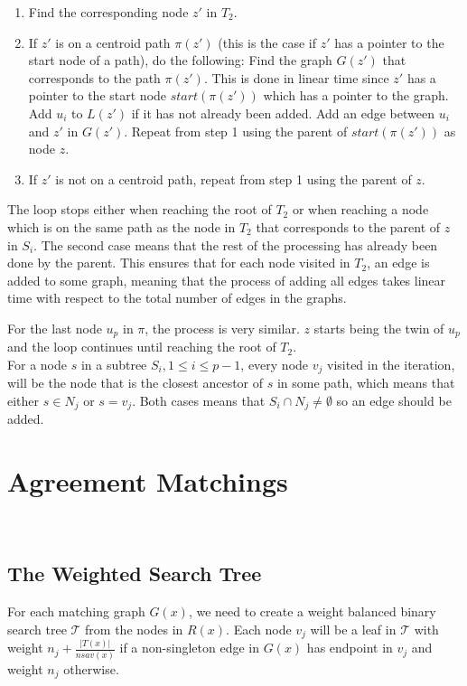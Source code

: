 \begin{enumerate}
	\item Find the corresponding node $z'$ in $T_2$.
	\item If $z'$ is on a centroid path $\pi(z')$ (this is the case if $z'$ has a pointer to the start node of a path), do the following:
	\subitem Find the graph $G(z')$ that corresponds to the path $\pi(z')$. This is done in linear time since $z'$ has a pointer to the start node $start(\pi(z'))$ which has a pointer to the graph.
	\subitem Add $u_i$ to $L(z')$ if it has not already been added.
	\subitem Add an edge between $u_i$ and $z'$ in $G(z')$.
	\subitem Repeat from step 1 using the parent of $start(\pi(z'))$ as node $z$.
	\item If $z'$ is not on a centroid path, repeat from step 1 using the parent of $z$.
\end{enumerate}
The loop stops either when reaching the root of $T_2$ or when reaching a node which is on the same path as the node in $T_2$ that corresponds to the parent of $z$ in $S_i$. The second case means that the rest of the processing has already been done by the parent. This ensures that for each node visited in $T_2$, an edge is added to some graph, meaning that the process of adding all edges takes linear time with respect to the total number of edges in the graphs.

For the last node $u_p$ in $\pi$, the process is very similar. $z$ starts being the twin of $u_p$ and the loop continues until reaching the root of $T_2$.\\

For a node $s$ in a subtree $S_i, 1 \le i \le p-1$, every node $v_j$ visited in the iteration, will be the node that is the closest ancestor of $s$ in some path, which means that either $s \in N_j$ or $s=v_j$. Both cases means that $S_i \cap N_j \ne \emptyset$ so an edge should be added.

\section{Agreement Matchings}
\\

\subsection{The Weighted Search Tree}
For each matching graph $G(x)$, we need to create a weight balanced binary search tree $\mathcal{T}$ from the nodes in $R(x)$. Each node $v_j$ will be a leaf in $\mathcal{T}$ with weight $n_j + \frac{|T(x)|}{nsav(x)}$ if a non-singleton edge in $G(x)$ has endpoint in $v_j$ and weight $n_j$ otherwise.

